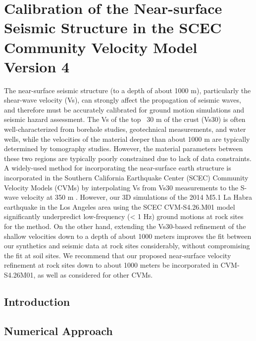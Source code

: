 
\linespread{1.7}
\chapter{Calibration of the Near-surface Seismic Structure in the SCEC Community Velocity Model Version 4}
\linespread{2.0}
\label{chap:highf}

\graphicspath{{/Users/zhh076/work/PhD_way/high_f/}}

The near-surface seismic structure (to a depth of about 1000 m), particularly the shear-wave velocity (Vs), can strongly affect the propagation of seismic waves, and therefore must be accurately calibrated for ground motion simulations and seismic hazard assessment. The Vs of the top ~30 m of the crust (Vs30) is often well-characterized from borehole studies, geotechnical measurements, and water wells, while the velocities of the material deeper than about 1000 m are typically determined by tomography studies. However, the material parameters between these two regions are typically poorly constrained due to lack of data constraints. A widely-used method for incorporating the near-surface earth structure is incorporated in the Southern California Earthquake Center (SCEC) Community Velocity Models (CVMs) by interpolating Vs from Vs30 measurements to the S-wave velocity at 350 m \citep{elyVs30derivedNearsurfaceSeismic2010}. However, our 3D simulations of the 2014 M5.1 La Habra earthquake in the Los Angeles area using the SCEC CVM-S4.26.M01 model significantly underpredict low-frequency (< 1 Hz) ground motions at rock sites for the \citet{elyVs30derivedNearsurfaceSeismic2010} method. On the other hand, extending the Vs30-based refinement of the shallow velocities down to a depth of about 1000 meters improves the fit between our synthetics and seismic data at rock sites considerably, without compromising the fit at soil sites. We recommend that our proposed near-surface velocity refinement at rock sites down to about 1000 meters be incorporated in CVM-S4.26M01, as well as considered for other CVMs.


\section{Introduction} \label{introduction}



\section{Numerical Approach}\label{approach}


